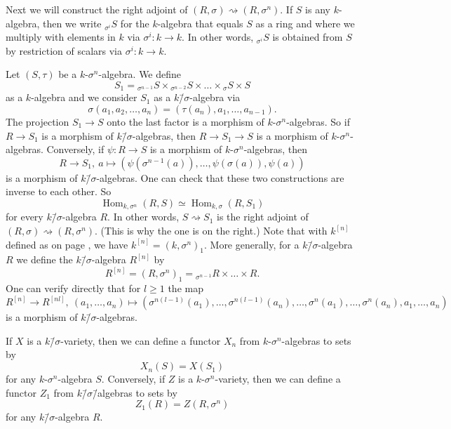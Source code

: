\documentclass[oneside,reqno]{amsart}
\theoremstyle{definition}
\newtheorem{ex}[theo]{Example}
\newcommand{\Hom}{\operatorname{Hom}}
\newcommand{\s}{\sigma}
\newcommand{\ks}{$k$\=/$\s$}
\newcommand{\kn}{k^{[n]}}
\begin{document}
 
 Next we will construct the right adjoint of $(R,\s)\rightsquigarrow (R,\s^n)$. If $S$ is any $k$-algebra, then we write ${_{\s^{i}}S}$ for the $k$-algebra that equals $S$ as a ring and where we multiply with elements in $k$ via $\s^i \colon k \to k$. In other words, ${_{\s^{i}}S}$ is obtained from $S$ by restriction of scalars via $\s^i \colon k \to k$.

 
 Let $(S,\tau)$ be a $k$-$\s^n$-algebra. We define
 $$S_1={_{\s^{n-1}}S}\times{_{\s^{n-2}}S}\times\ldots\times{_\s S}\times S$$ as a $k$-algebra and we consider $S_1$ as a \ks-algebra via
 $$\s(a_1,a_2,\ldots,a_n)=(\tau(a_n),a_1,\ldots,a_{n-1}).$$ The projection $S_1\to S$ onto the last factor is a morphism of $k$-$\s^n$-algebras. So if $R\to S_1$ is a morphism of \ks-algebras, then $R\to S_1\to S$ is a morphism of $k$-$\s^n$-algebras. Conversely, if $\psi\colon R\to S$ is a morphism of $k$-$\s^n$-algebras, then $$R\to S_1,\ a\mapsto (\psi(\s^{n-1}(a)),\ldots,\psi(\s(a)),\psi(a))$$ is a morphism of \ks-algebras. One can check that these two constructions are inverse to each other. So	 
 $$\Hom_{k,\s^n}(R,S)\simeq\Hom_{k,\s}(R,S_1)$$ for every \ks-algebra $R$.
 In other words, $S\rightsquigarrow S_1$ is the right adjoint of $(R,\sigma)\rightsquigarrow (R,\s^n)$. (This is why the one is on the right.) Note that with $\kn$ defined as on page \pageref{page: kn}, we have $\kn=(k,\s^n)_1$. More generally, for a \ks-algebra $R$ we define the \ks-algebra $R^{[n]}$ by
 $$R^{[n]}=(R,\s^n)_1={_{\s^{n-1}}R}\times \ldots\times  R.$$ One can verify directly that for $l\geq 1$ the map
  $$R^{[n]}\to R^{[nl]},\ (a_1,\ldots,a_n)\mapsto (\s^{n(l-1)}(a_1),\ldots,\s^{n(l-1)}(a_n),\ldots,\s^n(a_1),\ldots,\s^n(a_n),a_1,\ldots,a_n)$$
  is a morphism of \ks-algebras.



 
 
 If $X$ is a \ks-variety, then we can define a functor $X_n$ from $k$-$\s^n$-algebras to sets by $$X_n(S)=X(S_1)$$
 for any $k$-$\s^n$-algebra $S$. 
 Conversely, if $Z$ is a $k$-$\s^n$-variety, then we can define a functor $Z_1$ from \ks\=/algebras to sets by
 $$Z_1(R)=Z(R,\s^n)$$
 for any \ks-algebra $R$.
 
\end{document}
